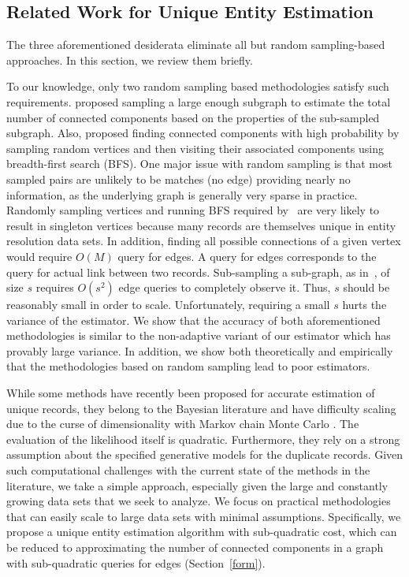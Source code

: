 \documentclass{imsart}
\begin{document}
\subsection{Related Work for Unique Entity Estimation}
\label{sec:RelatedWork}

The three aforementioned desiderata eliminate all but random sampling-based approaches. In this section, we review them briefly.

To our knowledge, only two random sampling based methodologies satisfy such requirements. \cite{1978paper} proposed sampling a large enough subgraph to estimate the total number of connected components based on the properties of the sub-sampled subgraph. Also, \cite{chazelle2005approximating} proposed finding connected components with high probability by sampling random vertices and then visiting their associated components using breadth-first search (BFS). One major issue with random sampling is that most sampled pairs are unlikely to be matches (no edge) providing nearly no information, as the underlying graph is generally very sparse in practice. Randomly sampling vertices and running BFS required by~\cite{chazelle2005approximating} are very likely to result in singleton vertices because many records are themselves unique in entity resolution data sets. In addition, finding all possible connections of a given vertex would require $O(M)$ query for edges. A query for edges corresponds  to the query for actual link between two records. Sub-sampling a sub-graph, as in~\cite{1978paper}, of size $s$ requires $O(s^2)$ edge queries to completely observe it. Thus, $s$ should be reasonably small in order to scale. Unfortunately, requiring a small $s$ hurts the variance of the estimator. We show that the accuracy of both aforementioned methodologies is similar to the non-adaptive variant of our estimator which has provably large variance. In addition, we show both theoretically and empirically that the methodologies based on random sampling lead to poor estimators.

While some methods have recently been proposed for accurate estimation of unique records, they belong to the Bayesian literature and have difficulty scaling due to the curse of dimensionality with Markov chain Monte Carlo \cite{steorts??bayesian, sadinle_2014, liseo_2011}. The evaluation of the likelihood itself is quadratic. Furthermore, they rely on a strong assumption about the specified generative models for the duplicate records. Given such computational challenges with the current state of the methods in the literature, we take a simple approach, especially given the large and constantly growing  data sets that we seek to analyze. We focus on practical methodologies that can easily scale to large data sets with minimal assumptions. Specifically, we propose a unique entity estimation algorithm with sub-quadratic cost, which can be reduced to approximating the number of connected components in a graph with sub-quadratic queries for edges (Section~\ref{form}).
\end{document}
